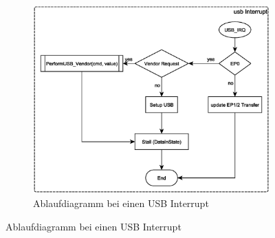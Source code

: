 \begin{figure}[h!]
\begin{subfigure}[b]{0.65\textwidth}
        	 \includegraphics[width=1\textwidth, trim=0mm 0mm 0mm 0mm, clip=true]{images/software/usb_irq.eps}%
	    		\caption{Ablaufdiagramm bei einen USB Interrupt}
	    		\label{fig:Ablaufusb_interrupt}
        \end{subfigure}        
\end{figure}
\clearpage

